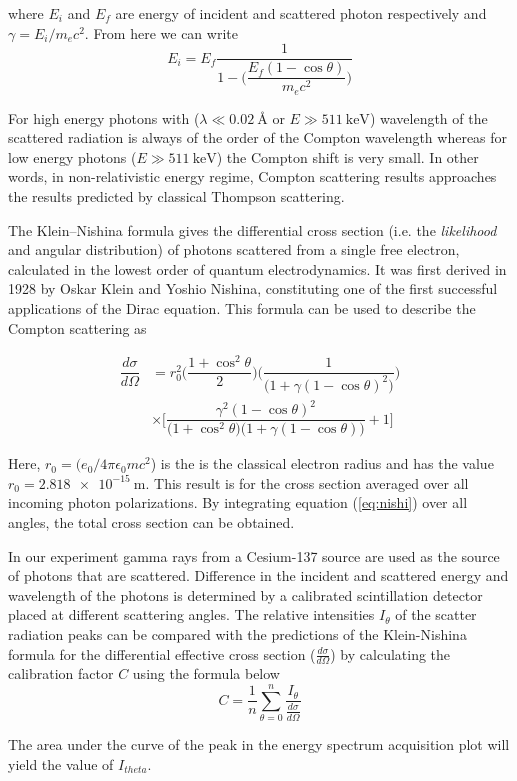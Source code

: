\documentclass[%
 reprint,
nofootinbib,
 amsmath,amssymb,
 aps,
floatfix,
]{revtex4-2}
\begin{document}
    where $E_i$ and $E_f$ are energy of incident and scattered photon respectively and $\gamma = E_i/m_e c^2$. From here we can write
    \begin{equation}
        E_i = E_f \dfrac{1}{1 - \Bigg( \dfrac{E_{f} (1 - \cos \theta)}{m_e c^2}  \Bigg)}
    \end{equation}
    \par 
    For high energy photons with ($\lambda \ll \SI{0.02}{\angstrom}$ or $E \gg \SI{511}{\kilo \electronvolt}$) wavelength of the scattered radiation is always of the order of the Compton wavelength whereas for low energy photons ($E \gg \SI{511}{\kilo \electronvolt}$) the Compton shift is very small. In other words, in non-relativistic energy regime, Compton scattering results approaches the results predicted by classical Thompson scattering.
    \par
    The Klein–Nishina formula gives the differential cross section (i.e. the \textit{likelihood} and angular distribution) of photons scattered from a single free electron, calculated in the lowest order of quantum electrodynamics. It was first derived in 1928 by Oskar Klein and Yoshio Nishina, constituting one of the first successful applications of the Dirac equation. This formula can be used to describe the Compton scattering as

    \begin{equation}
    \label{eq:nishi}
        \begin{split}
            \dfrac{d \sigma}{d \Omega} &= r_0^2 \Bigg( \dfrac{1 + \cos^2 \theta}{2} \Bigg) \Bigg( \dfrac{1}{\big( 1 + \gamma (1 - \cos \theta)^2 \big)} \Bigg) \\ 
            & \times \Bigg[ \dfrac{\gamma^2 (1 - \cos \theta)^2}{\big( 1 + \cos^2 \theta  \big) \big( 1 + \gamma (1 - \cos \theta) \big)} + 1 \Bigg]
        \end{split}
    \end{equation}

    Here, $r_0 = (e_0/4 \pi \epsilon_0 m c^2$) is the is the classical electron radius and has the value $r_0 = \SI{2.818e-15}{\metre}$. This result is for the cross section averaged over all incoming photon polarizations. By integrating equation (\ref{eq:nishi}) over all angles, the total cross section can be obtained.
    \par
    In our experiment gamma rays from a Cesium-137 source are used as the source of photons that are scattered. Difference in the incident and scattered energy and wavelength of the photons is determined by a calibrated scintillation detector placed at different scattering angles. The relative intensities $I_{\theta}$ of the scatter radiation peaks can be compared with the predictions of the Klein-Nishina formula for the differential effective cross section ($\frac{d \sigma}{d \Omega}$) by calculating the calibration factor $C$ using the formula below
    \begin{equation}
    \label{eq:calib}
        C = \dfrac{1}{n} \sum_{\theta = 0}^{n} \dfrac{I_{\theta}}{\frac{d \sigma}{d \Omega}}
    \end{equation}
    \par
    The area under the curve of the peak in the energy spectrum acquisition plot will yield the value of $I_{theta}$.
\end{document}
